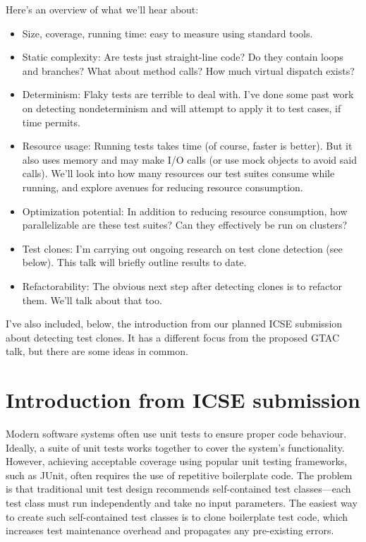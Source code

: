 \documentclass[10pt]{article}
\begin{document}
Here's an overview of what we'll hear about:
\begin{itemize}
\item Size, coverage, running time: easy to measure using standard tools.
\item Static complexity: Are tests just straight-line code? Do they contain loops and branches? What about method calls? How much virtual dispatch exists?
\item Determinism: Flaky tests are terrible to deal with. I've done some past work on detecting nondeterminism and will attempt to apply it to test cases, if time permits.
\item Resource usage: Running tests takes time (of course, faster is better). But it also uses memory and may make I/O calls (or use mock objects to avoid said calls). We'll look into how many resources our test suites consume while running, and explore avenues for reducing resource consumption.
\item Optimization potential: In addition to reducing resource consumption, how parallelizable are these test suites? Can they effectively be run on clusters?
\item Test clones: I'm carrying out ongoing research on test clone detection (see below). This talk will briefly outline results to date.
\item Refactorability: The obvious next step after detecting clones is to refactor them. We'll talk about that too.
\end{itemize}


I've also included, below, the introduction from our planned ICSE
submission about detecting test clones. It has a different focus
from the proposed GTAC talk, but there are some ideas in common.

\section{Introduction from ICSE submission}
Modern software systems often use unit tests to ensure proper code
behaviour. Ideally, a suite of unit tests works together to cover
the system's functionality. However, achieving acceptable
coverage using popular unit testing frameworks, such as JUnit, often
requires the use of repetitive boilerplate code. The problem is that
traditional unit test design recommends self-contained test
classes---each test class must run independently and take no input
parameters. The easiest way to create such self-contained test classes
is to clone boilerplate test code, which increases test maintenance
overhead and propagates any pre-existing errors. 
\end{document}
